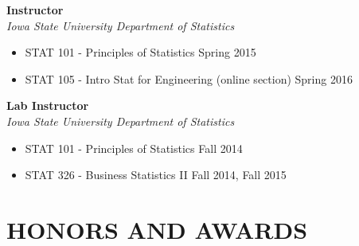 \documentclass{res} %
\begin{document}
\begin{resume}
{\bf Instructor} \\
{\sl Iowa State University Department of Statistics}
\begin{itemize} \itemsep -2pt
\item STAT 101 - Principles of Statistics \dotfill Spring 2015
\item STAT 105 - Intro Stat for Engineering (online section) \dotfill Spring 2016
\end{itemize}

{\bf Lab Instructor} \\
{\sl Iowa State University Department of Statistics}
\begin{itemize} \itemsep -2pt 
\item STAT 101 - Principles of Statistics \dotfill Fall 2014
\item STAT 326 - Business Statistics II \dotfill Fall 2014, Fall 2015
\end{itemize}



%


\section{HONORS AND AWARDS}


\end{resume}
\end{document}
